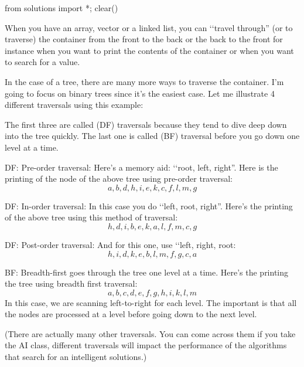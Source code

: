 \begin{python0}
from solutions import *; clear()
\end{python0}

When you have an array, vector or a linked list,
you can \lq\lq travel through'' (or to traverse) the container 
from the front to the back or the back to the front
for instance when you want to print the contents of the 
container or when you want to search for a value.

In the case of a tree, there are many more ways to traverse
the container.
I'm going to focus on binary trees since it's the easiest case.
Let me illustrate 4 different traversals using this example:



The first three are called  (DF) traversals because 
they tend to dive deep down into the tree quickly.
The last one is called  (BF) traversal
before you go down one level at a time.


\begin{itemize}

\li DF: Pre-order traversal:
Here's a memory aid: \lq\lq root, left, right''.
Here is the printing of the node  of the above tree using
pre-order traversal:
\[
a, b, d, h, i, e, k, c, f, l, m, g
\]

\li DF: In-order traversal:
In this case you do \lq\lq left, root, right''.
Here's the printing of the above tree using this method of traversal:
\[
h, d, i, b, e, k, a, l, f, m, c, g
\]

\li DF: Post-order traversal:
And for this one, use \lq\lq left, right, root:
\[
h, i, d, k, e, b, l, m, f, g, c, a
\]

\li BF: 
Breadth-first goes through the tree one level at a time.
Here's the printing the tree using breadth first traversal:
\[
a, b, c, d, e, f, g, h, i, k, l, m
\]
In this case, we are scanning left-to-right for each level.
The important is that all the nodes are processed at a level
before going down to the next level.
\end{itemize}

(There are actually many other traversals. 
You can come across them if you take the AI class, 
different traversals will impact the performance of the  
algorithms that search for an intelligent solutions.)

